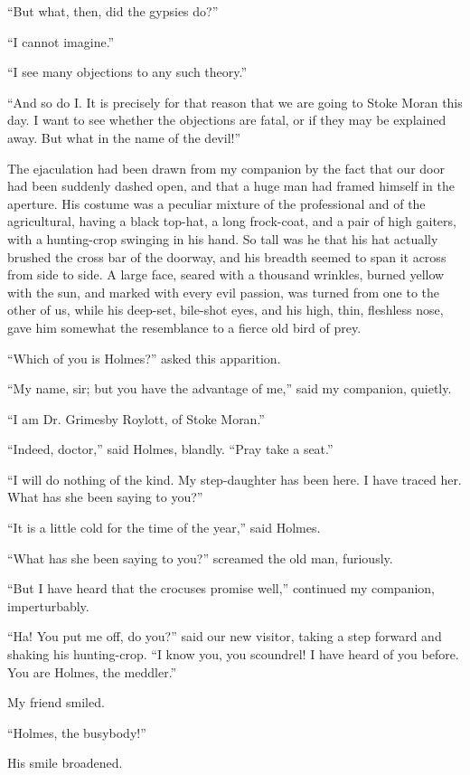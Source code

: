 “But what, then, did the gypsies do?”

“I cannot imagine.”

“I see many objections to any such theory.”

“And so do I. It is precisely for that reason that we are
going to Stoke Moran this day. I want to see whether the
objections are fatal, or if they may be explained away. But
what in the name of the devil!”

The ejaculation had been drawn from my companion by
the fact that our door had been suddenly dashed open, and
that a huge man had framed himself in the aperture. His
costume was a peculiar mixture of the professional and of the
agricultural, having a black top-hat, a long frock-coat, and a
pair of high gaiters, with a hunting-crop swinging in his hand.
So tall was he that his hat actually brushed the cross bar of
the doorway, and his breadth seemed to span it across from
side to side. A large face, seared with a thousand wrinkles,
burned yellow with the sun, and marked with every evil passion,
was turned from one to the other of us, while his deep-set,
bile-shot eyes, and his high, thin, fleshless nose, gave him
somewhat the resemblance to a fierce old bird of prey.

“Which of you is Holmes?” asked this apparition.

“My name, sir; but you have the advantage of me,” said
my companion, quietly.

“I am Dr. Grimesby Roylott, of Stoke Moran.”

“Indeed, doctor,” said Holmes, blandly. “Pray take a
seat.”

“I will do nothing of the kind. My step-daughter has been
here. I have traced her. What has she been saying to you?”

“It is a little cold for the time of the year,” said Holmes.

“What has she been saying to you?” screamed the old man,
furiously.

“But I have heard that the crocuses promise well,” continued
my companion, imperturbably.

“Ha! You put me off, do you?” said our new visitor,
taking a step forward and shaking his hunting-crop. “I
know you, you scoundrel! I have heard of you before. You
are Holmes, the meddler.”

My friend smiled.

“Holmes, the busybody!”

His smile broadened.


